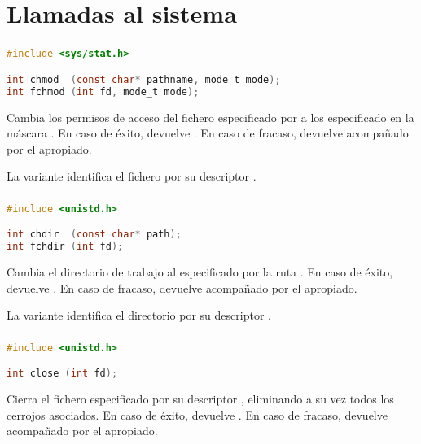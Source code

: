 \chapter{Llamadas al sistema}

\subsection{}\label{chmod}

\begin{lstlisting}[language=C]
#include <sys/stat.h>

int chmod  (const char* pathname, mode_t mode);
int fchmod (int fd, mode_t mode);
\end{lstlisting}

Cambia los permisos de acceso del fichero especificado por  a los especificado en la máscara .
En caso de éxito, devuelve .
En caso de fracaso, devuelve  acompañado por el  apropiado.

La variante  identifica el fichero por su descriptor .

\subsection{}\label{chdir}

\begin{lstlisting}[language=C]
#include <unistd.h>

int chdir  (const char* path);
int fchdir (int fd);
\end{lstlisting}

Cambia el directorio de trabajo al especificado por la ruta .
En caso de éxito, devuelve .
En caso de fracaso, devuelve  acompañado por el  apropiado.

La variante  identifica el directorio por su descriptor .

\subsection{}\label{close}

\begin{lstlisting}[language=C]
#include <unistd.h>

int close (int fd);
\end{lstlisting}

Cierra el fichero especificado por su descriptor , eliminando a su vez todos los cerrojos asociados.
En caso de éxito, devuelve .
En caso de fracaso, devuelve  acompañado por el  apropiado.

